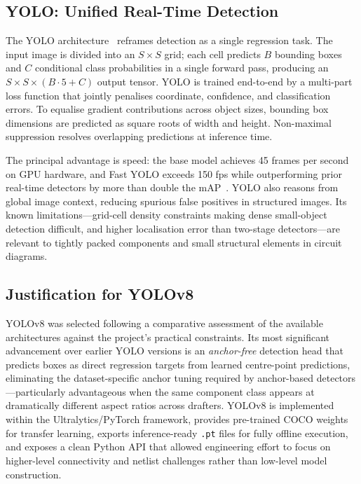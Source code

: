 \subsection{YOLO: Unified Real-Time Detection}

The YOLO architecture~\cite{redmon2016} reframes detection as a single regression task. The input image is divided into an $S \times S$ grid; each cell predicts $B$ bounding boxes and $C$ conditional class probabilities in a single forward pass, producing an $S \times S \times (B \cdot 5 + C)$ output tensor. YOLO is trained end-to-end by a multi-part loss function that jointly penalises coordinate, confidence, and classification errors. To equalise gradient contributions across object sizes, bounding box dimensions are predicted as square roots of width and height. Non-maximal suppression resolves overlapping predictions at inference time.

The principal advantage is speed: the base model achieves 45 frames per second on GPU hardware, and Fast YOLO exceeds 150 fps while outperforming prior real-time detectors by more than double the mAP~\cite{redmon2016}. YOLO also reasons from global image context, reducing spurious false positives in structured images. Its known limitations—grid-cell density constraints making dense small-object detection difficult, and higher localisation error than two-stage detectors—are relevant to tightly packed components and small structural elements in circuit diagrams.

\subsection{Justification for YOLOv8}

YOLOv8 was selected following a comparative assessment of the available architectures against the project's practical constraints. Its most significant advancement over earlier YOLO versions is an \emph{anchor-free} detection head that predicts boxes as direct regression targets from learned centre-point predictions, eliminating the dataset-specific anchor tuning required by anchor-based detectors—particularly advantageous when the same component class appears at dramatically different aspect ratios across drafters. YOLOv8 is implemented within the Ultralytics/PyTorch framework, provides pre-trained COCO weights for transfer learning, exports inference-ready \texttt{.pt} files for fully offline execution, and exposes a clean Python API that allowed engineering effort to focus on higher-level connectivity and netlist challenges rather than low-level model construction.

